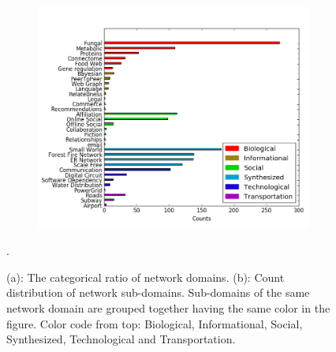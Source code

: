 \documentclass[..]{revtex4}
\begin{document}
\begin{figure}[H]
\begin{subfigure}{0.45\textwidth}
\includegraphics[width=\linewidth]{figs/subdomain_dist.png}
\caption{}\label{sub_dist}
\end{subfigure}\hspace*{\fill}

\caption{(a): The categorical ratio of network domains. (b):  Count distribution of network sub-domains. Sub-domains of the same network domain are grouped together having the same color in the figure. Color code from top: Biological, Informational, Social, Synthesized, Technological and Transportation.} \label{category_dist}.
\end{figure}
\end{document}
